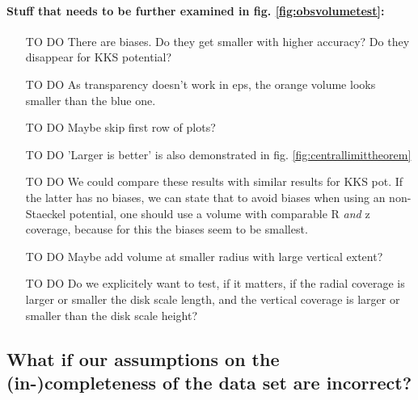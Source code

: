 \documentclass[12pt,preprint]{aastex}
\begin{document}
\paragraph{Stuff that needs to be further examined in fig. \ref{fig:obsvolumetest}:}
\begin{itemize}
\item [TO DO] There are biases. Do they get smaller with higher accuracy? Do they disappear for KKS potential?
\item [TO DO]  As transparency doesn't work in eps, the orange volume looks smaller than the blue one.
\item [TO DO] Maybe skip first row of plots?
\item [TO DO] 'Larger is better' is also demonstrated in fig. \ref{fig:centrallimittheorem}
\item [TO DO] We could compare these results with similar results for KKS pot. If the latter has no biases, we can state that to avoid biases when using an non-Staeckel potential, one should use a volume with comparable R \textit{and} z coverage, because for this the biases seem to be smallest.
\item [TO DO] Maybe add volume at smaller radius with large vertical extent?
\item [TO DO] Do we explicitely want to test, if it matters, if the radial coverage is larger or smaller the disk scale length, and the vertical coverage is larger or smaller than the disk scale height?
\end{itemize}



\subsection{What if our assumptions on the (in-)completeness of the data set are incorrect?}
\end{document}
